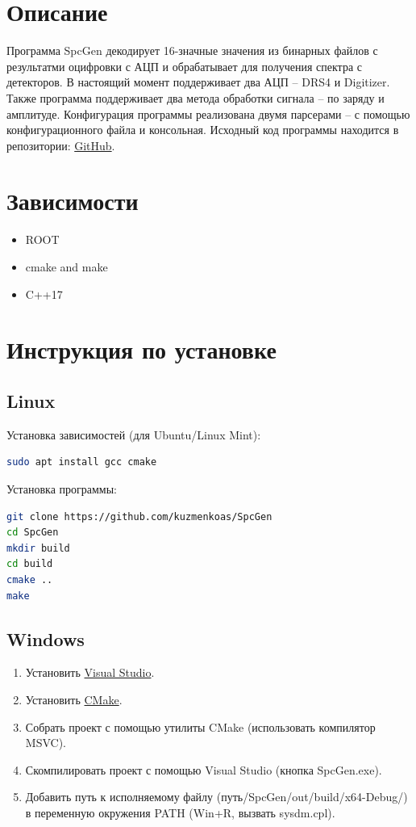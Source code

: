 \documentclass[12pt,a4paper,openany]{article}
\begin{document}
\section{Описание}
Программа SpcGen декодирует 16-значные значения из бинарных файлов с результатми оцифровки с АЦП и обрабатывает для получения спектра с детекторов.
В настоящий момент поддерживает два АЦП -- DRS4 и Digitizer. Также программа поддерживает два метода обработки сигнала -- по заряду и амплитуде.
Конфигурация программы реализована двумя парсерами -- с помощью конфигурационного файла и консольная.
Исходный код программы находится в репозитории: \href{https://github.com/kuzmenkoas/SpcGen}{GitHub}.

\section{Зависимости}
\begin{itemize}
    \item ROOT
    \item cmake and make
    \item C++17
\end{itemize}

\section{Инструкция по установке}
\subsection{Linux}
Установка зависимостей (для Ubuntu/Linux Mint):
\begin{lstlisting}[language=bash]
sudo apt install gcc cmake
\end{lstlisting}

Установка программы:
\begin{lstlisting}[language=bash]
git clone https://github.com/kuzmenkoas/SpcGen
cd SpcGen
mkdir build
cd build
cmake ..
make
\end{lstlisting}

\subsection{Windows}
\begin{enumerate}
    \item Установить \href{https://visualstudio.microsoft.com/downloads/}{Visual Studio}.
    \item Установить \href{https://cmake.org/download/}{CMake}.
    \item Собрать проект с помощью утилиты CMake (использовать компилятор MSVC).
    \item Скомпилировать проект с помощью Visual Studio (кнопка SpcGen.exe).
    \item Добавить путь к исполняемому файлу (путь/SpcGen/out/build/x64-Debug/) в переменную окружения PATH (Win+R, вызвать sysdm.cpl).
\end{enumerate}
\end{document}
